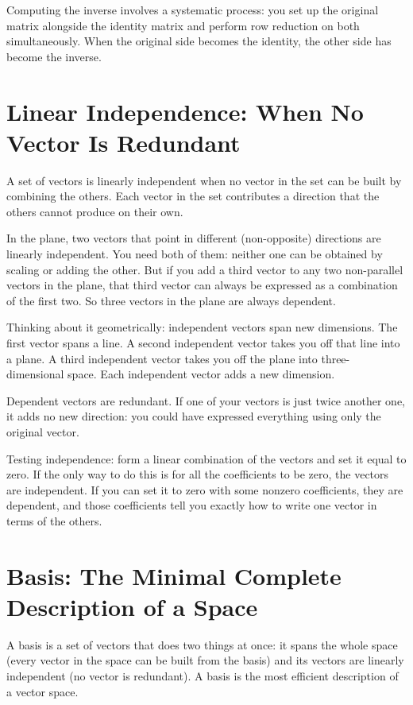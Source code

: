\documentclass[11pt]{article}
\begin{document}
Computing the inverse involves a systematic process: you set up the original matrix alongside the identity matrix and perform row reduction on both simultaneously. When the original side becomes the identity, the other side has become the inverse.

\section*{Linear Independence: When No Vector Is Redundant}

A set of vectors is linearly independent when no vector in the set can be built by combining the others. Each vector in the set contributes a direction that the others cannot produce on their own.

In the plane, two vectors that point in different (non-opposite) directions are linearly independent. You need both of them: neither one can be obtained by scaling or adding the other. But if you add a third vector to any two non-parallel vectors in the plane, that third vector can always be expressed as a combination of the first two. So three vectors in the plane are always dependent.

Thinking about it geometrically: independent vectors span new dimensions. The first vector spans a line. A second independent vector takes you off that line into a plane. A third independent vector takes you off the plane into three-dimensional space. Each independent vector adds a new dimension.

Dependent vectors are redundant. If one of your vectors is just twice another one, it adds no new direction: you could have expressed everything using only the original vector.

Testing independence: form a linear combination of the vectors and set it equal to zero. If the only way to do this is for all the coefficients to be zero, the vectors are independent. If you can set it to zero with some nonzero coefficients, they are dependent, and those coefficients tell you exactly how to write one vector in terms of the others.

\section*{Basis: The Minimal Complete Description of a Space}

A basis is a set of vectors that does two things at once: it spans the whole space (every vector in the space can be built from the basis) and its vectors are linearly independent (no vector is redundant). A basis is the most efficient description of a vector space.
\end{document}
